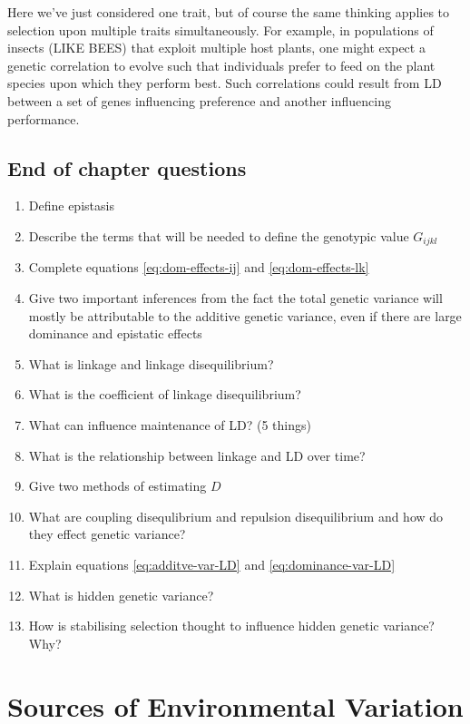 \documentclass[
]{book}
\providecommand{\tightlist}{%
  \setlength{\itemsep}{0pt}\setlength{\parskip}{0pt}}
\begin{document}
Here we've just considered one trait, but of course the same thinking applies to selection upon multiple traits simultaneously. For example, in populations of insects (LIKE BEES) that exploit multiple host plants, one might expect a genetic correlation to evolve such that individuals prefer to feed on the plant species upon which they perform best. Such correlations could result from LD between a set of genes influencing preference and another influencing performance.

\hypertarget{end-of-chapter-questions-2}{%
\section{End of chapter questions}\label{end-of-chapter-questions-2}}

\begin{enumerate}
\def\labelenumi{\arabic{enumi}.}
\tightlist
\item
  Define epistasis
\item
  Describe the terms that will be needed to define the genotypic value \(G_{ijkl}\)
\item
  Complete equations \eqref{eq:dom-effects-ij} and \eqref{eq:dom-effects-lk}
\item
  Give two important inferences from the fact the total genetic variance will mostly be attributable to the additive genetic variance, even if there are large dominance and epistatic effects
\item
  What is linkage and linkage disequilibrium?
\item
  What is the coefficient of linkage disequilibrium?
\item
  What can influence maintenance of LD? (5 things)
\item
  What is the relationship between linkage and LD over time?
\item
  Give two methods of estimating \(D\)
\item
  What are coupling disequlibrium and repulsion disequilibrium and how do they effect genetic variance?
\item
  Explain equations \eqref{eq:additve-var-LD} and \eqref{eq:dominance-var-LD}
\item
  What is hidden genetic variance?
\item
  How is stabilising selection thought to influence hidden genetic variance? Why?
\end{enumerate}

\hypertarget{sources-of-environmental-variation}{%
\chapter{Sources of Environmental Variation}\label{sources-of-environmental-variation}}
\end{document}

